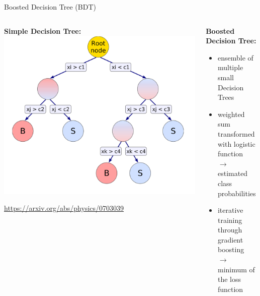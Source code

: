 \documentclass[aspectratio=1610, 10pt]{beamer}
\begin{document}
\begin{frame}{Boosted Decision Tree (BDT)}
  \begin{columns}
    \begin{column}{0.5\textwidth}
      \centering
      \textbf{Simple Decision Tree:}
      \includegraphics[width=\textwidth]{images/decision_tree.png}

      \tiny \url{https://arxiv.org/abs/physics/0703039}
    \end{column}
    \begin{column}{0.5\textwidth}
      \textbf{Boosted Decision Tree:}
      \begin{itemize}
        \item ensemble of multiple small Decision Trees
        \item weighted sum transformed with logistic function \\$\rightarrow$ estimated class probabilities
        \item iterative training through gradient boosting \\$\rightarrow$ minimum of the loss function
      \end{itemize}
    \end{column}
  \end{columns}
\end{frame}
\end{document}
